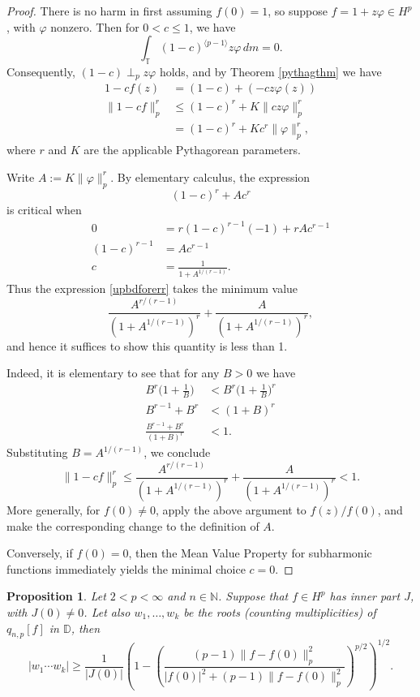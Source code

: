 \documentclass{article}
\theoremstyle{plain}
\numberwithin{Theorem}{section}
\numberwithin{equation}{section}
\theoremstyle{plain}
\newtheorem{Proposition}[Theorem]{Proposition}
\theoremstyle{definition}
\def\phi{\varphi}
\renewcommand{\leq}{\leqslant}
\renewcommand{\geq}{\geqslant}
\begin{document}
\begin{proof}
There is no harm in first assuming $f(0) = 1$, so suppose $f = 1 + z\phi \in H^p$, with $\phi$ nonzero.  Then for $0<c\leq 1$, we have
\[
     \int_{\mathbb{T}} (1-c)^{\langle p-1\rangle} z\phi\, dm = 0.
\]
Consequently, $(1-c) \perp_p z\phi$ holds, and by Theorem \ref{pythagthm} we have
\begin{align}
    1 - cf(z) &=  (1 - c) +  (-cz\phi(z)) \nonumber \\
    \|1 - cf\|_p^r  &\leq (1-c)^r + K\|cz\phi\|_p^r  \nonumber \\
         &= (1-c)^r + Kc^r \|\phi\|_p^r, \label{upbdforerr}
\end{align}
where $r$ and $K$ are the applicable Pythagorean parameters.

Write $A := K\|\phi\|_p^r$. By elementary calculus, the expression
\[
       (1-c)^r + Ac^r 
\]
is critical when 
\begin{align*}
     0 &= r(1-c)^{r-1}(-1) + rAc^{r-1} \\ 
     (1-c)^{r-1} &= Ac^{r-1} \\
       c  &=  \frac{1}{1 + A^{1/(r-1)}}.
\end{align*}
Thus the expression \eqref{upbdforerr} takes the minimum value
\[
     \frac{A^{r/(r-1)}}{(1 + A^{1/(r-1)})^r} + \frac{A}{(1 + A^{1/(r-1)})^r},
\]
and hence it suffices to show this quantity is less than 1.

Indeed, it is elementary to see that for any $B>0$ we have
\begin{align*}
   B^r\Big( 1 + \frac{1}{B}\Big)  &<  B^r\Big( 1 + \frac{1}{B}\Big)^r \\
   B^{r-1} + B^r  &<  (1 + B)^r  \\
   \frac{B^{r-1} + B^r}{(1 + B)^r } &< 1.
\end{align*}
Substituting $B = A^{1/(r-1)}$, we conclude
\[
    \|1 - cf\|_p^r  \leq \frac{A^{r/(r-1)}}{(1 + A^{1/(r-1)})^r} + \frac{A}{(1 + A^{1/(r-1)})^r} < 1.
\]
More generally, for $f(0)\neq 0$, apply the above argument to $f(z)/f(0)$, and make the corresponding change to the definition of $A$.

Conversely, if $f(0)=0$, then the Mean Value Property for subharmonic functions immediately yields the minimal choice  $c=0$.


\end{proof}
\begin{Proposition}
Let $2 < p < \infty$ and $n\in\mathbb{N}$. Suppose that $f \in H^p$ has inner part $J$, with $J(0) \neq 0$. Let also $w_1,\dots,w_k$ be the roots (counting multiplicities) of $q_{n,p}[f]$ in $\mathbb{D}$, then
\[
|w_1\cdots w_k| \geq \frac{1}{|J(0)|} \left(1 - \left( \frac{(p - 1)\|f - f(0)\|_p^2}{|f(0)|^2 + (p - 1)\|f - f(0)\|_p^2} \right)^{p/2} \right)^{1/2}.
\]
\end{Proposition}
\end{document}
